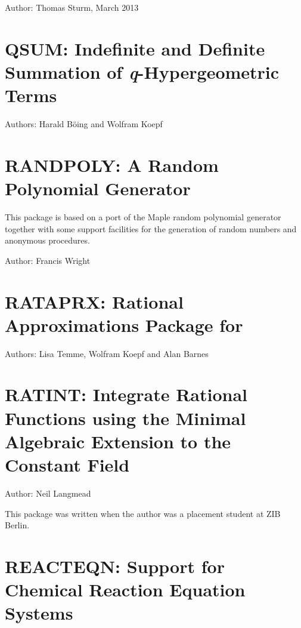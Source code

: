 Author: Thomas Sturm, March 2013

\newpage


\section{QSUM: Indefinite and Definite Summation
of \textsl{q}-Hypergeometric Terms}

Authors: Harald B\"{o}ing and Wolfram Koepf



\newpage

\section{RANDPOLY: A Random Polynomial Generator}

This package is based on a port of the Maple random polynomial
generator together with some support facilities for the generation
of random numbers and anonymous procedures.

Author: Francis Wright



\newpage

\section{RATAPRX: Rational Approximations Package for \REDUCE}

Authors: Lisa Temme, Wolfram Koepf and Alan Barnes



\newpage

\section{RATINT: Integrate Rational Functions using the Minimal Algebraic                                                                                                                           Extension to the Constant Field}

Author: Neil Langmead

This package was written when the author was a placement student at ZIB Berlin.



\newpage

\section{REACTEQN: Support for Chemical Reaction Equation Systems}


